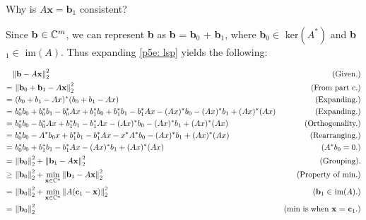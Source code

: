 Why is $A\textbf{x} = \textbf{b}_1$ consistent?
\partbreak
\vspace{-8mm}
\begin{solution}

    Since \textbf{b} $\in \mathbb{C}^m$, we can represent \textbf{b} as \textbf{b} = \textbf{b}$_0$ + \textbf{b}$_1$, where \textbf{b}$_0 \in$ ker$(A^*)$ and \textbf{b}$_1 \in$ im$(A)$. Thus expanding \ref{p5e: lsp} yields the following:
    
    \alignbreak
{\small
  \setlength{\abovedisplayskip}{0pt}
  \setlength{\belowdisplayskip}{\abovedisplayskip}
  \setlength{\abovedisplayshortskip}{0pt}
  \setlength{\belowdisplayshortskip}{3pt}
    \begin{align}
        &\norm{\textbf{b} - A\textbf{x}}_2^2 &\text{(Given.)}\nonumber\\
        =& \ \norm{\textbf{b}_0 + \textbf{b}_1 - A\textbf{x}}_2^2 &\text{(From part c.)}\nonumber\\
        =& \ (b_0 + b_1 - Ax)^*(b_0 + b_1 - Ax)   &\text{(Expanding.)}\nonumber\\
        =& \ b_0^*b_0 + b_0^*b_1 - b_0^*Ax + b_1^*b_0 + b_1^*b_1 - b_1^*Ax - (Ax)^*b_0 - (Ax)^*b_1 + (Ax)^*(Ax) &\text{(Expanding.)}\nonumber\\
        =& \ b_0^*b_0 - b_0^*Ax + b_1^*b_1 - b_1^*Ax - (Ax)^*b_0 - (Ax)^*b_1 + (Ax)^*(Ax) &\text{(Orthogonality.)}\nonumber\\
        =& \ b_0^*b_0 - A^*b_0x + b_1^*b_1 - b_1^*Ax - x^*A^*b_0 - (Ax)^*b_1 + (Ax)^*(Ax) &\text{(Rearranging.)}\nonumber\\
        =& \ b_0^*b_0 + b_1^*b_1 - b_1^*Ax - (Ax)^*b_1 + (Ax)^*(Ax) &(A^*b_0 = 0.)\nonumber\\ 
        =& \ \norm{\textbf{b}_0}_2^2 + \norm{\textbf{b}_1 - A\textbf{x}}_2^2  &\text{(Grouping).}\nonumber\\
        \geq& \ \norm{\textbf{b}_0}_2^2 + \min_{\textbf{x}\in \mathbb{C}^n}\norm{\textbf{b}_1 - A\textbf{x}}_2^2 &\text{(Property of min.)}\nonumber\\
        =& \ \norm{\textbf{b}_0}_2^2 + \min_{\textbf{x}\in \mathbb{C}^n}\norm{A(\textbf{c}_1 - \textbf{x})}_2^2  &\text{(\textbf{b}$_1 \in$ im$(A)$.)}\nonumber\\
        =& \ \norm{\textbf{b}_0}_2^2 &\text{(min is when \textbf{x} = \textbf{c}$_1$.)}\nonumber
    \end{align}
}%
    \alignbreak

\end{solution}
